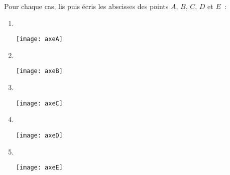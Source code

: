 \begin{exercice}[Abscisses]
Pour chaque cas, lis puis écris les abscisses des points $A$, $B$, $C$, $D$ et $E$ :
\begin{enumerate}
  \item \textcolor{white}{Vilain truc pour forcer saut de ligne}

	\begin{center} \texttt{[image: axeA]} \end{center}



\newpage



  \item \textcolor{white}{Vilain truc pour forcer saut de ligne}

	\begin{center} \texttt{[image: axeB]} \end{center}
  \item \textcolor{white}{Vilain truc pour forcer saut de ligne}

	\begin{center} \texttt{[image: axeC]} \end{center}
  \item \textcolor{white}{Vilain truc pour forcer saut de ligne}

	\begin{center} \texttt{[image: axeD]} \end{center}
  \item \textcolor{white}{Vilain truc pour forcer saut de ligne}

	\begin{center} \texttt{[image: axeE]} \end{center}
 \end{enumerate}
\end{exercice}


